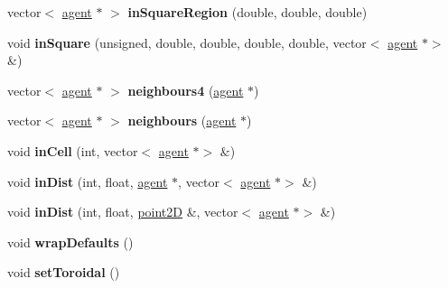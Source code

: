 \begin{DoxyCompactItemize}
\item 
\mbox{\label{classsearchGrid_aad8ab42926dab85d6f4afc5084bc532c}} 
vector$<$ \mbox{\hyperlink{classagent}{agent}} $\ast$ $>$ {\bfseries in\+Square\+Region} (double, double, double)
\item 
\mbox{\label{classsearchGrid_a7592f935d933f0554626e1fbb5afae35}} 
void {\bfseries in\+Square} (unsigned, double, double, double, double, vector$<$ \mbox{\hyperlink{classagent}{agent}} $\ast$$>$ \&)
\item 
\mbox{\label{classsearchGrid_a8e57ece6343c3a2671670dd1e1f7656b}} 
vector$<$ \mbox{\hyperlink{classagent}{agent}} $\ast$ $>$ {\bfseries neighbours4} (\mbox{\hyperlink{classagent}{agent}} $\ast$)
\item 
\mbox{\label{classsearchGrid_ad87996d5112f98ed4be35527adffe48f}} 
vector$<$ \mbox{\hyperlink{classagent}{agent}} $\ast$ $>$ {\bfseries neighbours} (\mbox{\hyperlink{classagent}{agent}} $\ast$)
\item 
\mbox{\label{classsearchGrid_ae7c79d583f544a9a3a25876c91ef8b0e}} 
void {\bfseries in\+Cell} (int, vector$<$ \mbox{\hyperlink{classagent}{agent}} $\ast$$>$ \&)
\item 
\mbox{\label{classsearchGrid_adbeb6c7d74d58cb5a3b524e031ddd67a}} 
void {\bfseries in\+Dist} (int, float, \mbox{\hyperlink{classagent}{agent}} $\ast$, vector$<$ \mbox{\hyperlink{classagent}{agent}} $\ast$$>$ \&)
\item 
\mbox{\label{classsearchGrid_a8a15b7ed8672da261df59004ffb543bc}} 
void {\bfseries in\+Dist} (int, float, \mbox{\hyperlink{classpoint2D}{point2D}} \&, vector$<$ \mbox{\hyperlink{classagent}{agent}} $\ast$$>$ \&)
\item 
\mbox{\label{classsearchGrid_ae0230d99ebe10057f8d68d4ee493ad7c}} 
void {\bfseries wrap\+Defaults} ()
\item 
\mbox{\label{classsearchGrid_aa52dec523a80080bc41896f95ee1cda7}} 
void {\bfseries set\+Toroidal} ()
\item 
\mbox{\label{classsearchGrid_add3e2c63256224cd8cb60e67146d6c9e}} 

\end{DoxyCompactItemize}
